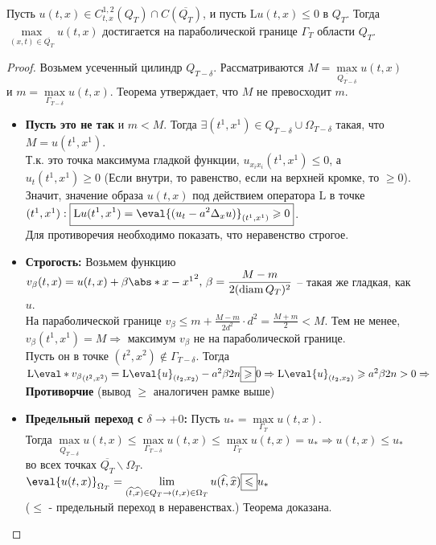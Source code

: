 \begin{theorem}
Пусть $u(t,x) \in C_{t, x}^{1,2}(Q_T) \cap C(\overline{Q_T})$, и пусть 
$\mathrm{L}u(t,x) \leq 0$ в $Q_T$. Тогда $\max\limits_{(x,t) \in \overline{Q_T}} u(t,x)$ достигается на параболической границе $ \Gamma_T $ области $Q_T$.


\begin{proof}
Возьмем усеченный цилиндр $Q_{T-\delta}$. Рассматриваются $M = \max\limits_{\overline{Q_{T-\delta}}} u(t,x)$ и $m = \max\limits_{\Gamma_{T-\delta}} u(t,x)$. Теорема утверждает, что $M$ не превосходит $m$.\\
\begin{itemize}
\item {\bf Пусть это не так} и $m < M$. Тогда $\exists (t^1,x^1) \in Q_{T-\delta} \cup \Omega_{T-\delta}$ такая, что $M = u(t^1, x^1)$. \\
Т.к. это точка максимума гладкой функции, $u_{x_ix_i}(t^1,x^1) \leq 0$, а $u_t(t^1, x^1) \geq 0$ (Если внутри, то равенство, если на верхней кромке, то $\geq 0$).\\
Значит, значение образа $u(t,x)$ под действием оператора $\mathrm{L}$ в точке $(t^1, x^1): \boxed{\mathrm{L}u(t^1, x^1) = \eval{(u_t -a^2 \Delta_x u)}_{(t^1,x^1)}  \geq 0}$.\\
Для противоречия необходимо показать, что неравенство строгое.\\

 \item {\bf Строгость:}
Возьмем функцию $v_\beta(t,x) = u(t,x) +\beta \abs*{x-x^1}^2, \, \beta = \dfrac{M-m}{2(\mathrm{diam} \, Q_T)^2}$ -- такая же гладкая, как $u$.\\
 На параболической границе $v_\beta \leq m + \frac{M-m}{2d^2}\cdot d^2 = \frac{M+m}{2} < M$.
Тем не менее, $v_\beta(t^1, x^1) = M \Rightarrow$ максимум $v_\beta$ не на параболической границе.\\
Пусть он в точке $(t^2, x^2) \notin \Gamma_{T-\delta}$. Тогда $\mathrm{L}\eval*{v_\beta}_{(t^2,x^2)} = \mathrm{L}\eval{u}_{(t_2, x_2)} - a^2 \beta 2n \boxed{\geqslant} 0 \Rightarrow \\
\mathrm{L}\eval{u}_{(t_2,x_2)} \geq a^2 \beta 2n > 0 \Rightarrow$
{\bf Противорчие} (вывод $\boxed{\geq}$ аналогичен рамке выше)
 
\item {\bf Предельный переход с $\delta \rightarrow+0$:}
Пусть $u_{*} = \max\limits_{\Gamma_T} u(t,x)$. \\
Тогда $\max\limits_{\overline{Q_{T-\delta}}}u(t,x) \leq \max\limits_{{\Gamma_{T-\delta}}}u(t,x) \leq \max\limits_{{\Gamma_{T}}}u(t,x) = u_* \Rightarrow
u(t,x) \leq u_*$
во всех точках $\overline{Q_T} \backslash \Omega_T$.\\
$\eval{u(t,x)}_{\Omega_T} = \lim\limits_{(\widehat{t}, \widehat{x}) \in Q_T \rightarrow (t,x) \in \Omega_T} u(\widehat{t},\widehat{x}) \boxed{\leq} u_*$ 
\\($\boxed{\leq}$ - предельный переход в неравенствах.) Теорема доказана.
\end{itemize}

\end{proof}
\end{theorem}


